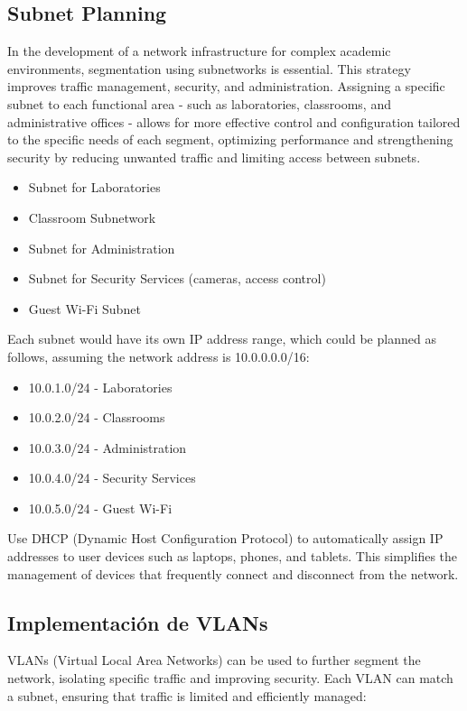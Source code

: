 \documentclass[12pt]{article}
\begin{document}
\subsection{Subnet Planning}

In the development of a network infrastructure for complex academic environments, segmentation using subnetworks is essential. This strategy improves traffic management, security, and administration. Assigning a specific subnet to each functional area - such as laboratories, classrooms, and administrative offices - allows for more effective control and configuration tailored to the specific needs of each segment, optimizing performance and strengthening security by reducing unwanted traffic and limiting access between subnets.

\begin{itemize}
    \item Subnet for Laboratories
    \item Classroom Subnetwork
    \item Subnet for Administration
    \item Subnet for Security Services (cameras, access control)
    \item Guest Wi-Fi Subnet
\end{itemize}

Each subnet would have its own IP address range, which could be planned as follows, assuming the network address is 10.0.0.0.0/16:

\begin{itemize}
    \item 10.0.1.0/24 - Laboratories
    \item 10.0.2.0/24 - Classrooms
    \item 10.0.3.0/24 - Administration
    \item 10.0.4.0/24 - Security Services
    \item 10.0.5.0/24 - Guest Wi-Fi
\end{itemize}

Use DHCP (Dynamic Host Configuration Protocol) to automatically assign IP addresses to user devices such as laptops, phones, and tablets. This simplifies the management of devices that frequently connect and disconnect from the network.

\subsection{Implementación de VLANs}

VLANs (Virtual Local Area Networks) can be used to further segment the network, isolating specific traffic and improving security. Each VLAN can match a subnet, ensuring that traffic is limited and efficiently managed:
\end{document}
